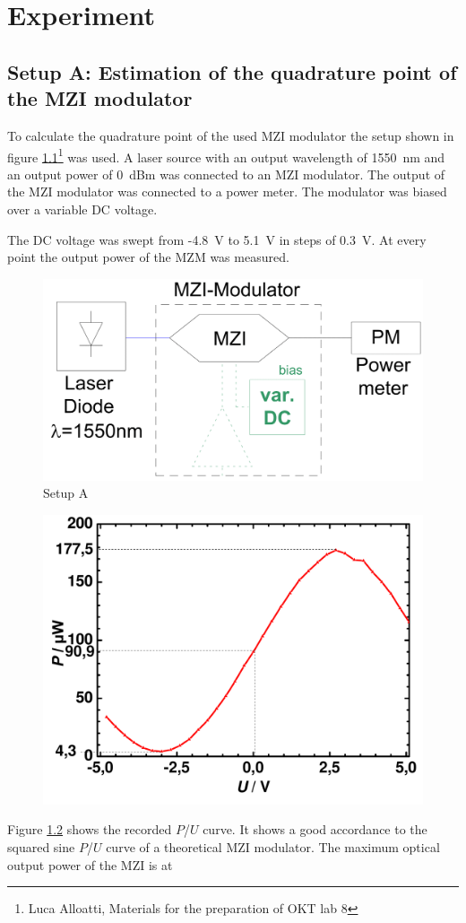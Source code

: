 \chapter{Experiment}

\section{Setup A: Estimation of the quadrature point of the MZI modulator}
To calculate the quadrature point of the used MZI modulator the setup shown in figure \ref{fig:A_setup}\footnote[3]{Luca Alloatti, Materials for the preparation of OKT lab 8} was used. A laser source with an output wavelength of 1550~nm and an output power of 0~dBm was connected to an MZI modulator. The output of the MZI modulator was connected to a power meter. The modulator was biased over a variable DC voltage.

The DC voltage was swept from -4.8~V to 5.1~V in steps of 0.3~V. At every point the output power of the MZM was measured.

\begin{figure}%
\centering
\includegraphics[width=.6\columnwidth]{Grafiken/SetupA.png}%
\caption{Setup A}%
\label{fig:A_setup}%
\end{figure}

\begin{figure}%
\centering
\includegraphics[width=.6\columnwidth]{Grafiken/A_quadratur.pdf}%
\caption{}%
\label{fig:A_quadratur}%
\end{figure}

 Figure \ref{fig:A_quadratur} shows the recorded $P$/$U$ curve. It shows a good accordance to the squared sine $P$/$U$ curve of a theoretical MZI modulator.
The maximum optical output power of the MZI is at 